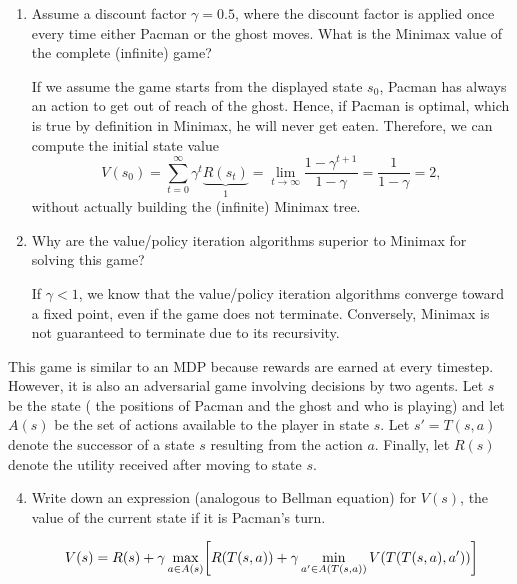 \documentclass[11pt, a4paper]{article}
\begin{document}
\begin{enumerate}
    \item Assume a discount factor $\gamma = 0.5$, where the discount factor is applied once every time either Pacman or the ghost moves. What is the Minimax value of the complete (infinite) game?

    \begin{solution}
        If we assume the game starts from the displayed state $s_0$, Pacman has always an action to get out of reach of the ghost. Hence, if Pacman is optimal, which is true by definition in Minimax, he will never get eaten. Therefore, we can compute the initial state value
        \begin{equation*}
            V(s_0) = \sum_{t = 0}^\infty \gamma^t \underbrace{R(s_t)}_{1} = \lim_{t \to \infty} \frac{1 - \gamma^{t+1}}{1 - \gamma} = \frac{1}{1 - \gamma} = 2 ,
        \end{equation*}
        without actually building the (infinite) Minimax tree.
    \end{solution}

    \item Why are the value/policy iteration algorithms superior to Minimax for solving this game?

    \begin{solution}
        If $\gamma < 1$, we know that the value/policy iteration algorithms converge toward a fixed point, even if the game does not terminate. Conversely, Minimax is not guaranteed to terminate due to its recursivity.
    \end{solution}

\end{enumerate}

This game is similar to an MDP because rewards are earned at every timestep. However, it is also an adversarial game involving decisions by two agents. Let $s$ be the state (\eg{} the positions of Pacman and the ghost and who is playing) and let $A(s)$ be the set of actions available to the player in state $s$. Let $s' = T(s, a)$ denote the successor of a state $s$ resulting from the action $a$. Finally, let $R(s)$ denote the utility received after moving to state $s$.

\begin{enumerate}
    \setcounter{enumi}{3}
    \item Write down an expression (analogous to Bellman equation) for $V(s)$, the value of the current state if it is Pacman's turn.

    \begin{solution}
        \begin{equation*}
            V(s) = R(s) + \gamma \max_{a \in A(s)} \sbk*{ R(T(s, a)) + \gamma \min_{a' \in A(T(s, a))} V(T(T(s, a), a')) }
        \end{equation*}
    \end{solution}
\end{enumerate}
\end{document}
